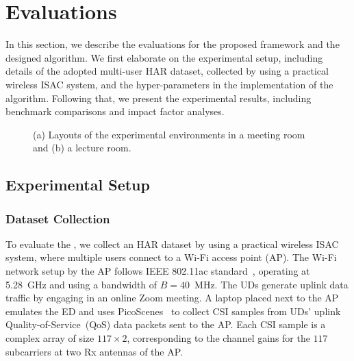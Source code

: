\section{Evaluations}\label{sec_eva}

In this section, we describe the evaluations for the proposed \name framework and the designed algorithm.
We first elaborate on the experimental setup, including details of the adopted multi-user HAR dataset, collected by using a practical wireless ISAC system, and the hyper-parameters in the implementation of the algorithm.
Following that, we present the experimental results, including benchmark comparisons and impact factor analyses.
\begin{figure}[b]
    \vspace{-1em}
	\centering 
	\setlength{\abovecaptionskip}{6pt} 
	\setlength{\belowdisplayskip}{-5pt}
	\vspace{-.7ex}
	\caption{(a) Layouts of the experimental environments in a meeting room and (b) a lecture room.}
	\label{fig:implementOverview}
\end{figure} 
%
\begin{figure*}[t]
	\label{fig_overall_compare}
\end{figure*}
\subsection{Experimental Setup}\label{s2ec_exp_setup}

\subsubsection{Dataset Collection}
To evaluate the \name, we collect an HAR dataset by using a practical wireless ISAC system, where multiple users connect to a Wi-Fi access point (AP).
The Wi-Fi network setup by the AP follows IEEE 802.11ac standard~\cite{IEEE_standard}, operating at 5.28\!~GHz and using a bandwidth of $B=40$\!~MHz.
The UDs generate uplink data traffic by engaging in an online Zoom meeting. 
A laptop placed next to the AP emulates the ED and uses PicoScenes~\cite{PicoScenes_IoIJ21} to collect CSI samples from UDs' uplink Quality-of-Service~(QoS) data packets sent to the AP. 
Each CSI sample is a complex array of size $117\times 2$, corresponding to the channel gains for the $117$ subcarriers at two Rx antennas of the AP.

